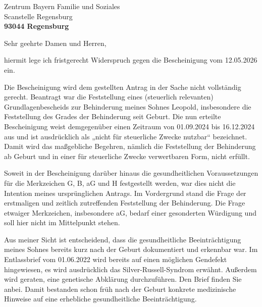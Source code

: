 \documentclass[a4paper,12pt]{dinbrief}
\begin{document}
 
\setbottomtexttop{2cm}
\subject{\textbf{Widerspruch Bescheid 4702-2401 vom 12.05.2026} }
\signature{Dr.~Fabian Schury}
\Datum{\today} 
\address{Dr.~Fabian Schury \\ Reichenfelser Straße 10 \\ 91086 Aurachtal}
 
\begin{letter} 
{   Zentrum Bayern Familie und Soziales\\
    Scanstelle Regensburg \\[0.5cm]
    \textbf{\Large 93044 Regensburg} }
\opening{ Sehr geehrte Damen und Herren,}

hiermit lege ich fristgerecht Widerspruch gegen die Bescheinigung vom
12.05.2026 ein.

Die Bescheinigung wird dem gestellten Antrag in der Sache nicht vollständig
gerecht. Beantragt war die Feststellung eines (steuerlich relevanten)
Grundlagenbescheids zur Behinderung meines Sohnes Leopold, insbesondere die
Feststellung des Grades der Behinderung seit Geburt. Die nun erteilte
Bescheinigung weist demgegenüber einen Zeitraum von 01.09.2024 bis 16.12.2024
aus und ist ausdrücklich als „nicht für steuerliche Zwecke nutzbar“ bezeichnet.
Damit wird das maßgebliche Begehren, nämlich die Feststellung der Behinderung
ab Geburt und in einer für steuerliche Zwecke verwertbaren Form, nicht erfüllt.

Soweit in der Bescheinigung darüber hinaus die gesundheitlichen Voraussetzungen
für die Merkzeichen G, B, aG und H festgestellt werden, war dies nicht die
Intention meines ursprünglichen Antrags. Im Vordergrund stand die Frage der
erstmaligen und zeitlich zutreffenden Feststellung der Behinderung. Die Frage
etwaiger Merkzeichen, insbesondere aG, bedarf einer gesonderten Würdigung und
soll hier nicht im Mittelpunkt stehen. 

Aus meiner Sicht ist entscheidend, dass die gesundheitliche Beeinträchtigung
meines Sohnes bereits kurz nach der Geburt dokumentiert und erkennbar war. Im
Entlassbrief vom 01.06.2022 wird bereits auf einen möglichen Gendefekt
hingewiesen, es wird ausdrücklich das Silver-Russell-Syndrom erwähnt. Außerdem
wird geraten, eine genetische Abklärung durchzuführen. Den Brief finden Sie
anbei. Damit bestanden schon früh nach der Geburt konkrete medizinische
Hinweise auf eine erhebliche gesundheitliche Beeinträchtigung. 


\end{letter}
\end{document}
